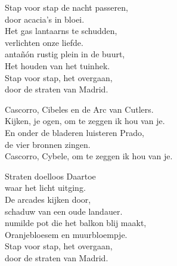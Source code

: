 \clearpage
\begin{translation}
Stap voor stap de nacht passeren,\\
door acacia's in bloei.\\
Het gas lantaarns te schudden,\\
verlichten onze liefde.\\
antañón rustig plein in de buurt,\\
Het houden van het tuinhek.\\
Stap voor stap, het overgaan,\\
door de straten van Madrid.\vspace{\wlskip}

Cascorro, Cibeles en de Arc van Cutlers.\\
Kijken, je ogen, om te zeggen ik hou van je.\\
En onder de bladeren luisteren Prado,\\
de vier bronnen zingen.\\
Cascorro, Cybele, om te zeggen ik hou van je.\vspace{\wlskip}

Straten doelloos Daartoe\\
waar het licht uitging.\\
De arcades kijken door,\\
schaduw van een oude landauer.\\
numilde pot die het balkon blij maakt,\\
Oranjebloesem en muurbloempje.\\
Stap voor stap, het overgaan,\\
door de straten van Madrid.
\end{translation}
